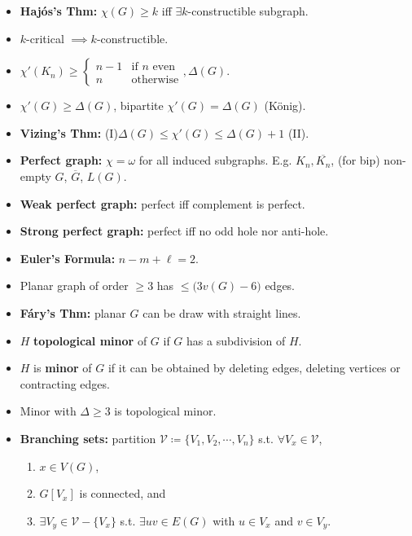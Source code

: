 \documentclass[10pt]{article}
\begin{document}
\begin{multicols*}{3}
\begin{itemize}
            \item \textbf{Haj\'{o}s's Thm:} $\chi(G) \geq k$ iff $\exists k$-constructible subgraph.
            \item $k$-critical $\implies k$-constructible.
            \item $\chi'(K_n) \geq \begin{cases}
                n - 1 & \textrm{if } n \textrm{ even} \\
                n & \textrm{otherwise}
            \end{cases}, \Delta(G)$. 
            \item $\chi'(G) \geq \Delta(G)$, bipartite $\chi'(G) = \Delta(G)$ (K\"{o}nig).
            \item \textbf{Vizing's Thm:} (I)$\Delta(G) \leq \chi'(G) \leq \Delta(G) + 1$ (II). 
            \item \textbf{Perfect graph:} $\chi = \omega$ for all induced subgraphs. E.g. $K_n, \overline{K_n}$, (for bip) non-empty $G$, $\overline{G}$, $L(G)$.
            \item \textbf{Weak perfect graph:} perfect iff complement is perfect.
            \item \textbf{Strong perfect graph:} perfect iff no odd hole nor anti-hole.
            \item \textbf{Euler's Formula:} $n - m + \ell = 2$.
            \item Planar graph of order $\geq 3$ has $\leq \bigl(3v(G) - 6\bigr)$ edges.
            \item \textbf{F\'{a}ry's Thm:} planar $G$ can be draw with straight lines.
            \item $H$ \textbf{topological minor} of $G$ if $G$ has a subdivision of $H$.
            \item $H$ is \textbf{minor} of $G$ if it can be obtained by deleting edges, deleting vertices or contracting edges.
            \item Minor with $\Delta \geq 3$ is topological minor.
            \item \textbf{Branching sets:} partition $\mathcal{V} \coloneqq \{V_1, V_2, \cdots, V_n\}$ s.t. $\forall V_x \in \mathcal{V}$,
            \begin{enumerate}
                \item $x \in V(G)$,
                \item $G[V_x]$ is connected, and
                \item $\exists V_y \in \mathcal{V} - \{V_x\}$ s.t. $\exists uv \in E(G)$ with $u \in V_x$ and $v \in V_y$.

\end{enumerate}
\end{itemize}
\end{multicols*}
\end{document}
